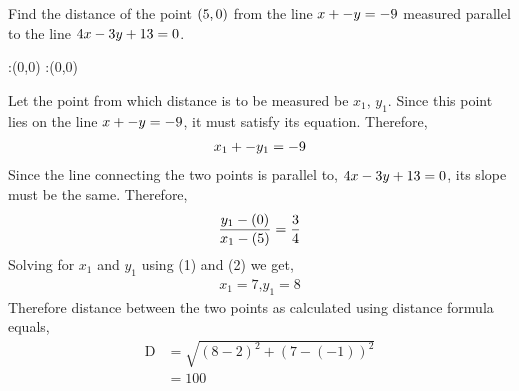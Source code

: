 \question[3] Find the distance of the point $(5, 0)$ from the line $ x + - y = -9$ measured parallel to the line $4 x -3 y + 13 = 0$.



\watchout

\ifprintanswers
  \begin{marginfigure}
      :(0,0)
      :(0,0)
    \figdrawbegin{}
      \figdrawline [100,101]
    \figdrawend
    \figvisu{\figBoxA}{}{%
    }
    \centerline{\box\figBoxA}
  \end{marginfigure}
\fi 

\begin{solution}[\halfpage]
  Let the point from which distance is to be measured be $x_{1}$, $y_{1}$.
  Since this point lies on the line $ x + - y = -9$, it 
  must satisfy its equation. Therefore,
  \begin{align}
  	 x_{1} + - y_{1} = -9  	
  \end{align}  
  Since the line connecting the two points is parallel to, $4 x 
  -3 y + 13 = 0$, its slope must be the same. Therefore,
  \begin{align}
  	\dfrac{y_{1}-(0)}{x_{1}-(5)} = \dfrac{3}{4}
  \end{align}
  Solving for $x_{1}$ and $y_{1}$ using (1) and (2) we get,
  \begin{align}
  	x_{1} = 7 \text{,} y_{1} = 8 \nonumber
  \end{align}
  Therefore distance between the two points as calculated using
  distance formula equals,
  \begin{align}
  	\text{D} &= \sqrt{(8-2)^2+(7-(-1))^2} \nonumber \\
  			 &= 100 \nonumber
  \end{align}
\end{solution}
